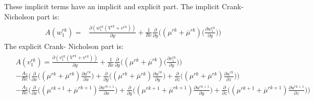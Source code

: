 \documentclass[preprint,12pt]{article}
\begin{document}
These implicit terms have an implicit and explicit part. The implicit Crank- Nicholson part is:
\begin{align}\begin{split}
A(w_1^{rk})=&\frac{\partial (w_1^{rk}(V^{rk}+v^{rk}))}{\partial y}+\frac{1}{Re}\frac{\partial}{\partial y}\Big(({\mu}^{rk}+\overline{\mu}^{rk})\Big(\frac{\partial w_1^{rk}}{\partial y}\Big)\Big)
\end{split} \end{align}	
The explicit Crank- Nicholson part is:
\begin{align}\begin{split}
&A(v_1^{rk})=\frac{\partial (v_1^{rk}(V^{rk}+v^{rk}))}{\partial y}+\frac{1}{Re}\frac{\partial}{\partial y}\Big(({\mu}^{rk}+\overline{\mu}^{rk})\Big(\frac{\partial v_1^{rk}}{\partial y}\Big)\Big)\\&-\frac{A_2}{Re}\Bigg(\frac{\partial}{\partial x}\Big((\mu^{rk}+\overline{\mu}^{rk})\frac{\partial u^{rk}}{\partial x}\Big)+\frac{\partial}{\partial y}\Big((\mu^{rk}+\overline{\mu}^{rk})\frac{\partial u^{rk}}{\partial y}\Big)+\frac{\partial}{\partial z}\Big((\mu^{rk}+\overline{\mu}^{rk})\frac{\partial u^{rk}}{\partial z}\Big)\Bigg)\\&-\frac{A_2}{Re}\Bigg(\frac{\partial}{\partial x}\Big((\mu^{rk+1}+\overline{\mu}^{rk+1})\frac{\partial u^{rk+1}}{\partial x}\Big)+\frac{\partial}{\partial y}\Big((\mu^{rk+1}+\overline{\mu}^{rk+1})\frac{\partial u^{rk+1}}{\partial y}\Big)+\frac{\partial}{\partial z}\Big((\mu^{rk+1}+\overline{\mu}^{rk+1})\frac{\partial u^{rk+1}}{\partial z}\Big)\Bigg)
\end{split} \end{align}	
\end{document}
